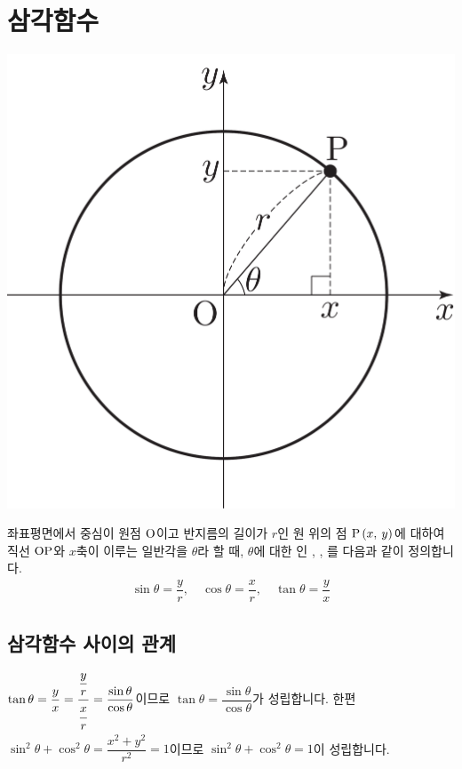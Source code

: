 \section{삼각함수}
\begin{center}
\includegraphics[scale=0.125]{pic0/pic155.pdf}
\end{center}좌표평면에서 중심이 원점 $\mrm{O}$이고 반지름의 길이가 $r$인 원 위의 점 $\xy[P]{x}{y}$에 대하여 직선 $\mrm{OP}$와 $x$축이 이루는 일반각을 $\theta$라 할 때, $\theta$에 대한 인 , , 를 다음과 같이 정의합니다.
\begin{align*}
  \sin \theta = \dfrac{y}{r},\quad
  \cos \theta = \dfrac{x}{r},\quad
  \tan \theta = \dfrac{y}{x}
\end{align*}
\clearpage
\subsection{삼각함수 사이의 관계}
$\tan\theta =\dfrac{y}{x} = \dfrac{\qfrac{y}{r}}{\qfrac*{x}{r}} =\dfrac{\sin\theta}{\cos\theta}$이므로 $\tan\theta=\dfrac{\sin\theta}{\cos\theta}$가 성립합니다. 한편 $\sin^2 \theta + \cos^2 \theta = \dfrac{x^2+y^2}{r^2} = 1$이므로 $\sin^2 \theta + \cos^2 \theta = 1$이 성립합니다.

